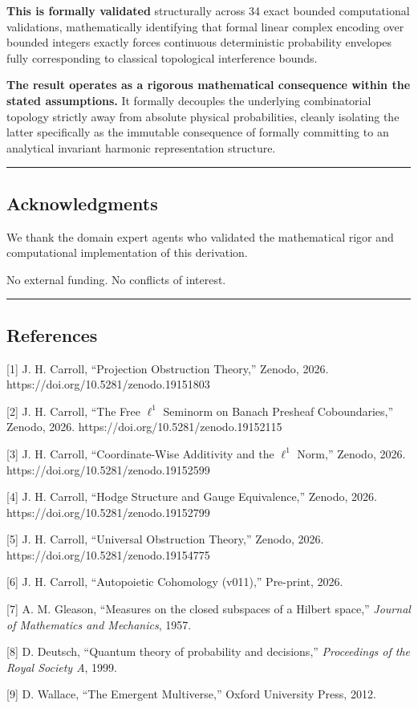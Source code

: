 \documentclass[
]{article}
\begin{document}
\textbf{This is formally validated} structurally across 34 exact bounded
computational validations, mathematically identifying that formal linear
complex encoding over bounded integers exactly forces continuous
deterministic probability envelopes fully corresponding to classical
topological interference bounds.

\textbf{The result operates as a rigorous mathematical consequence
within the stated assumptions.} It formally decouples the underlying
combinatorial topology strictly away from absolute physical
probabilities, cleanly isolating the latter specifically as the
immutable consequence of formally committing to an analytical invariant
harmonic representation structure.

\begin{center}\rule{0.5\linewidth}{0.5pt}\end{center}

\subsection{Acknowledgments}\label{acknowledgments}

We thank the domain expert agents who validated the mathematical rigor
and computational implementation of this derivation.

No external funding. No conflicts of interest.

\begin{center}\rule{0.5\linewidth}{0.5pt}\end{center}

\subsection{References}\label{references}

{[}1{]} J. H. Carroll, ``Projection Obstruction Theory,'' Zenodo, 2026.
https://doi.org/10.5281/zenodo.19151803

{[}2{]} J. H. Carroll, ``The Free \(\ell^1\) Seminorm on Banach Presheaf
Coboundaries,'' Zenodo, 2026. https://doi.org/10.5281/zenodo.19152115

{[}3{]} J. H. Carroll, ``Coordinate-Wise Additivity and the \(\ell^1\)
Norm,'' Zenodo, 2026. https://doi.org/10.5281/zenodo.19152599

{[}4{]} J. H. Carroll, ``Hodge Structure and Gauge Equivalence,''
Zenodo, 2026. https://doi.org/10.5281/zenodo.19152799

{[}5{]} J. H. Carroll, ``Universal Obstruction Theory,'' Zenodo, 2026.
https://doi.org/10.5281/zenodo.19154775

{[}6{]} J. H. Carroll, ``Autopoietic Cohomology (v011),'' Pre-print,
2026.

{[}7{]} A. M. Gleason, ``Measures on the closed subspaces of a Hilbert
space,'' \emph{Journal of Mathematics and Mechanics}, 1957.

{[}8{]} D. Deutsch, ``Quantum theory of probability and decisions,''
\emph{Proceedings of the Royal Society A}, 1999.

{[}9{]} D. Wallace, ``The Emergent Multiverse,'' Oxford University
Press, 2012.
\end{document}
